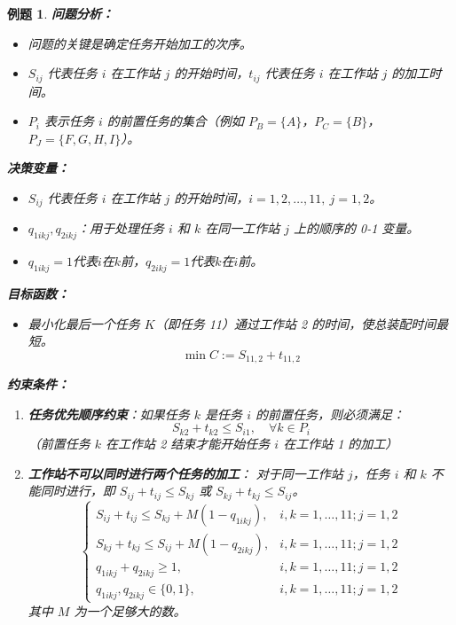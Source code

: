 \documentclass[a4paper,12pt]{ctexart} %
\newtheorem{example}{例题}[section]
\begin{document}
\begin{example}
		\textbf{问题分析：}
		\begin{itemize}
			\item 问题的关键是确定任务开始加工的次序。
			\item $S_{ij}$ 代表任务 $i$ 在工作站 $j$ 的开始时间，$t_{ij}$ 代表任务 $i$ 在工作站 $j$ 的加工时间。
			\item $P_i$ 表示任务 $i$ 的前置任务的集合（例如 $P_B = \{A\}$，$P_C = \{B\}$，$P_J = \{F, G, H, I\}$）。
		\end{itemize}
		
		\textbf{决策变量：}
		\begin{itemize}
			\item $S_{ij}$ 代表任务 $i$ 在工作站 $j$ 的开始时间，$i = 1, 2, \dots, 11,\ j = 1, 2$。
			\item $q_{1ikj}, q_{2ikj}$：用于处理任务 $i$ 和 $k$ 在同一工作站 $j$ 上的顺序的 0-1 变量。
			\item $q_{1ikj}=1$代表$i$在$k$前，$q_{2ikj}=1$代表$k$在$i$前。
		\end{itemize}
		
		\textbf{目标函数：}
		\begin{itemize}
			\item 最小化最后一个任务 $K$（即任务 11）通过工作站 2 的时间，使总装配时间最短。
			\[
			\min C := S_{11,2} + t_{11,2}
			\]
		\end{itemize}
		
		\textbf{约束条件：}
		\begin{enumerate}
			\item \textbf{任务优先顺序约束}：如果任务 $k$ 是任务 $i$ 的前置任务，则必须满足：
			\[
			S_{k2} + t_{k2} \le S_{i1}, \quad \forall k \in P_i
			\]
			（前置任务 $k$ 在工作站 2 结束才能开始任务 $i$ 在工作站 1 的加工）
			
			\item \textbf{工作站不可以同时进行两个任务的加工}：
			对于同一工作站 $j$，任务 $i$ 和 $k$ 不能同时进行，即 $S_{ij} + t_{ij} \le S_{kj}$ 或 $S_{kj} + t_{kj} \le S_{ij}$。
			\[
			\begin{cases}
				S_{ij} + t_{ij} \le S_{kj} + M(1 - q_{1ikj}), & i, k = 1, \dots, 11; j = 1, 2 \\
				S_{kj} + t_{kj} \le S_{ij} + M(1 - q_{2ikj}), & i, k = 1, \dots, 11; j = 1, 2 \\
				q_{1ikj} + q_{2ikj} \ge 1, & i, k = 1, \dots, 11; j = 1, 2 \\
				q_{1ikj}, q_{2ikj} \in \{0,1\}, & i, k = 1, \dots, 11; j = 1, 2
			\end{cases}
			\]
			其中 $M$ 为一个足够大的数。
			

\end{enumerate}
\end{example}
\end{document}
